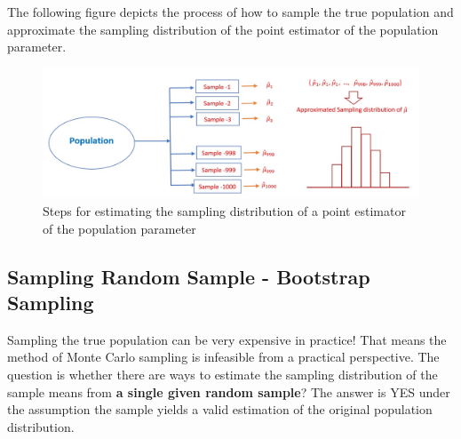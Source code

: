 \documentclass[
]{book}
\begin{document}
The following figure depicts the process of how to sample the true population and approximate the sampling distribution of the point estimator of the population parameter.

\begin{figure}

{\centering \includegraphics[width=0.8\linewidth]{img09/w09-ApproxSamplingDist} 

}

\caption{Steps for estimating the sampling distribution of a point estimator of the population parameter}\label{fig:unnamed-chunk-221}
\end{figure}

\hfill\break

\hypertarget{sampling-random-sample---bootstrap-sampling}{%
\subsection{Sampling Random Sample - Bootstrap Sampling}\label{sampling-random-sample---bootstrap-sampling}}

Sampling the true population can be very expensive in practice! That means the method of Monte Carlo sampling is infeasible from a practical perspective. The question is whether there are ways to estimate the sampling distribution of the sample means from \textbf{a single given random sample}? The answer is YES under the assumption the sample yields a valid estimation of the original population distribution.
\end{document}
